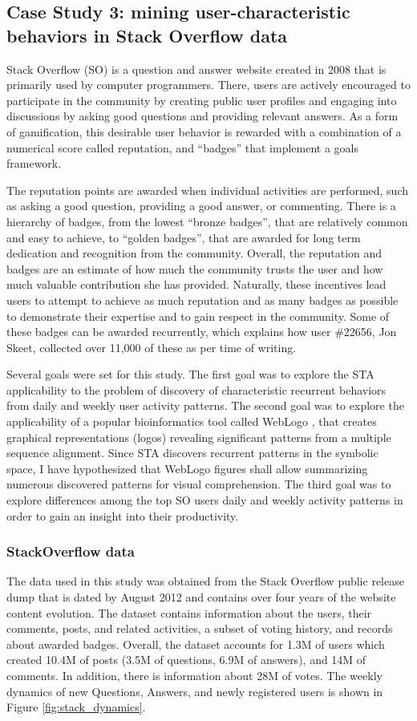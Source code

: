 \subsection{Case Study 3: mining user-characteristic behaviors in Stack Overflow data}\label{case3}
Stack Overflow (SO) is a question and answer website created in 2008 that is primarily used by computer programmers. There, users are actively encouraged to participate in the community by creating public user profiles and engaging into discussions by asking good questions and providing relevant answers. As a form of gamification, this desirable user behavior is rewarded with a combination of a numerical score called reputation, and ``badges'' that implement a goals framework. 

The reputation points are awarded when individual activities are performed, such as asking a good question, providing a good answer, or commenting. There is a hierarchy of badges, from the lowest ``bronze badges'', that are relatively common and easy to achieve, to ``golden badges'', that are awarded for long term dedication and recognition from the community. Overall, the reputation and badges are an estimate of how much the community trusts the user and how much valuable contribution she has provided. Naturally, these incentives lead users to attempt to achieve as much reputation and as many badges as possible to demonstrate their expertise and to gain respect in the community. Some of these badges can be awarded recurrently, which explains how user \#22656, Jon Skeet, collected over 11,000 of these as per time of writing.

Several goals were set for this study. The first goal was to explore the STA applicability to the problem of discovery of characteristic recurrent behaviors from daily and weekly user activity patterns. The second goal was to explore the applicability of a popular bioinformatics tool called WebLogo \cite{weblogo}, that creates graphical representations (logos) revealing significant patterns from a multiple sequence alignment. Since STA discovers recurrent patterns in the symbolic space, I have hypothesized that WebLogo figures shall allow summarizing numerous discovered patterns for visual comprehension. The third goal was to explore differences among the top SO users daily and weekly activity patterns in order to gain an insight into their productivity. 

\subsubsection{StackOverflow data}
The data used in this study was obtained from the Stack Overflow public release dump that is dated by August 2012 and contains over four years of the website content evolution. The dataset contains information about the users, their comments, posts, and related activities, a subset of voting history, and records about awarded badges.  Overall, the dataset accounts for 1.3M of users which created 10.4M of posts (3.5M of questions, 6.9M of answers), and 14M of comments. In addition, there is information about 28M of votes. The weekly dynamics of new Questions, Answers, and newly registered users is shown in Figure \ref{fig:stack_dynamics}.

